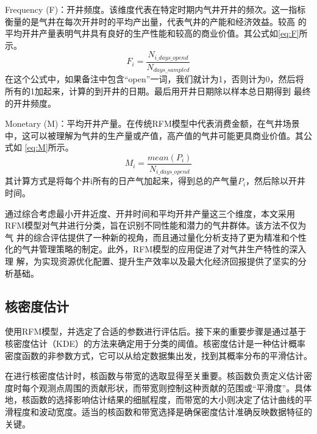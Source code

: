 Frequency (F)：开井频度。该维度代表在特定时期内气井开井的频次。这一指标衡量的是气井在每次开井时的平均产出量，代表气井的产能和经济效益。较高
的平均开井产量表明气井具有良好的生产性能和较高的商业价值。其公式如\eqref{eq:F}所示。
\begin{equation}
    F_i=\frac{N_{i\_days\_opend}}{N_{days\_sampled}}
    \label{eq:F}
\end{equation}
在这个公式中，如果备注中包含“open”一词，我们就计为1，否则计为0，然后将所有的1加起来，计算的到开井的日期。最后用开井日期除以样本总日期得到
最终的开井频度。

Monetary (M)：平均开井产量。在传统RFM模型中代表消费金额，在气井场景中，这可以被理解为气井的生产量或产值，高产值的气井可能更具商业价值。其公式如
\eqref{eq:M}所示。
\begin{equation}
    M_i = \frac{mean(P_i)}{N_{i\_days\_opend}}
    \label{eq:M}
\end{equation}
其计算方式是将每个井i所有的日产气加起来，得到总的产气量$P_i$，然后除以开井时间。

通过综合考虑最小开井近度、开井时间和平均开井产量这三个维度，本文采用RFM模型对气井进行分类，旨在识别不同性能和潜力的气井群体。该方法不仅为气
井的综合评估提供了一种新的视角，而且通过量化分析支持了更为精准和个性化的气井管理策略的制定。此外，RFM模型的应用促进了对气井生产特性的深入理
解，为实现资源优化配置、提升生产效率以及最大化经济回报提供了坚实的分析基础。
\subsection{核密度估计}
使用RFM模型，并选定了合适的参数进行评估后。接下来的重要步骤是通过基于核密度估计（KDE）的方法来确定用于分类的阈值。核密度估计是一种估计概率密度函数的非参数方式，它可以从给定数据集出发，找到其概率分布的平滑估计。

在进行核密度估计时，核函数与带宽的选取显得至关重要。核函数负责定义估计密度时每个观测点周围的贡献形状，而带宽则控制这种贡献的范围或“平滑度”。具体地，核函数的选择影响估计结果的细腻程度，而带宽的大小则决定了估计曲线的平滑程度和波动宽度。适当的核函数和带宽选择是确保密度估计准确反映数据特征的关键。

